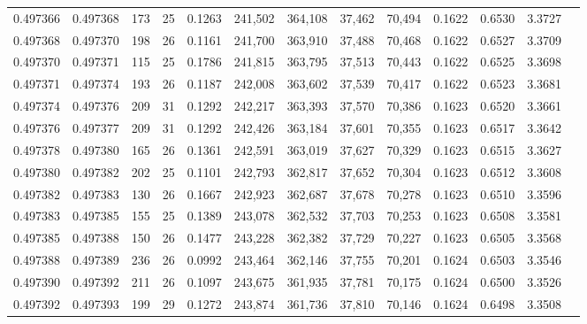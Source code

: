 \begin{tabular}{rrrrrrrrrrrrr}
0.497366 & 0.497368 & 173 &  25 &                                     0.1263 & 241,502 & 364,108 &  37,462 &  70,494 & 0.1622 & 0.6530 & 3.3727 \\
0.497368 & 0.497370 & 198 &  26 &                                     0.1161 & 241,700 & 363,910 &  37,488 &  70,468 & 0.1622 & 0.6527 & 3.3709 \\
0.497370 & 0.497371 & 115 &  25 &                                     0.1786 & 241,815 & 363,795 &  37,513 &  70,443 & 0.1622 & 0.6525 & 3.3698 \\
0.497371 & 0.497374 & 193 &  26 &                                     0.1187 & 242,008 & 363,602 &  37,539 &  70,417 & 0.1622 & 0.6523 & 3.3681 \\
0.497374 & 0.497376 & 209 &  31 &                                     0.1292 & 242,217 & 363,393 &  37,570 &  70,386 & 0.1623 & 0.6520 & 3.3661 \\
0.497376 & 0.497377 & 209 &  31 &                                     0.1292 & 242,426 & 363,184 &  37,601 &  70,355 & 0.1623 & 0.6517 & 3.3642 \\
0.497378 & 0.497380 & 165 &  26 &                                     0.1361 & 242,591 & 363,019 &  37,627 &  70,329 & 0.1623 & 0.6515 & 3.3627 \\
0.497380 & 0.497382 & 202 &  25 &                                     0.1101 & 242,793 & 362,817 &  37,652 &  70,304 & 0.1623 & 0.6512 & 3.3608 \\
0.497382 & 0.497383 & 130 &  26 &                                     0.1667 & 242,923 & 362,687 &  37,678 &  70,278 & 0.1623 & 0.6510 & 3.3596 \\
0.497383 & 0.497385 & 155 &  25 &                                     0.1389 & 243,078 & 362,532 &  37,703 &  70,253 & 0.1623 & 0.6508 & 3.3581 \\
0.497385 & 0.497388 & 150 &  26 &                                     0.1477 & 243,228 & 362,382 &  37,729 &  70,227 & 0.1623 & 0.6505 & 3.3568 \\
0.497388 & 0.497389 & 236 &  26 &                                     0.0992 & 243,464 & 362,146 &  37,755 &  70,201 & 0.1624 & 0.6503 & 3.3546 \\
0.497390 & 0.497392 & 211 &  26 &                                     0.1097 & 243,675 & 361,935 &  37,781 &  70,175 & 0.1624 & 0.6500 & 3.3526 \\
0.497392 & 0.497393 & 199 &  29 &                                     0.1272 & 243,874 & 361,736 &  37,810 &  70,146 & 0.1624 & 0.6498 & 3.3508 \\

\end{tabular}
